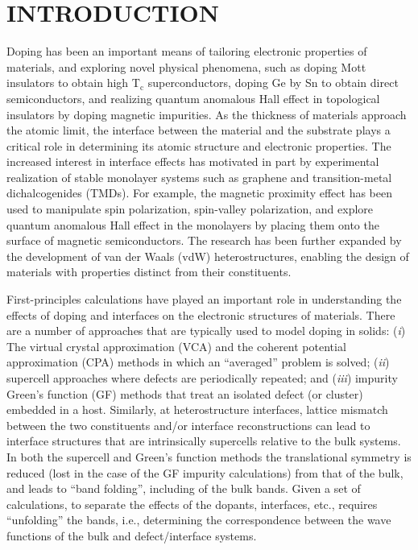 \documentclass[aps,prb,showpacs,twocolumn,reprint,superscriptaddress]{revtex4-1}
\begin{document}
\section{INTRODUCTION}
Doping has been an important means of tailoring electronic properties of materials, and exploring novel
physical phenomena, such as doping Mott insulators to obtain high T$_\mathrm{c}$
superconductors,\cite{bednorz_1986} doping Ge by Sn to obtain direct semiconductors, \cite{Gupta2013} and
realizing quantum anomalous Hall effect in topological insulators by doping magnetic
impurities.\cite{Yu2010,Chang2013} As the thickness of materials approach the atomic limit, the interface
between the material and the substrate plays a critical role in determining its atomic structure and electronic
properties.  The increased interest in interface effects has motivated in part by experimental realization of
stable monolayer systems such as graphene and transition-metal dichalcogenides (TMDs).  For example, the
magnetic proximity effect has been used to manipulate spin polarization, spin-valley polarization, and explore
quantum anomalous Hall effect in the monolayers by placing them onto the surface of magnetic
semiconductors.\cite{Yang2013,Wei2016,Li2015Giant,Zhang2016Large,Qiao2014,Wang2015,Zhang2015Quantum} The
research has been further expanded by the development of van der Waals (vdW) heterostructures, enabling
the design of materials with properties distinct from their constituents.\cite{Novoselov20162D} 

First-principles calculations have played an important role in understanding the effects of doping and
interfaces on the electronic structures of materials.  There are a number of approaches that are
typically used to model doping in solids: (\textit{i}) The virtual crystal approximation
(VCA)\cite{nordheim} and the coherent potential approximation (CPA)\cite{Gyorffy1972Coherent} methods in
which an ``averaged'' problem is solved; (\textit{ii}) supercell approaches where defects are
periodically repeated; and (\textit{iii}) impurity Green's function (GF) methods
\cite{KKR-defects,KKR-full} that treat an isolated defect (or cluster) embedded in a host. 
Similarly, at heterostructure interfaces, lattice mismatch
between the two constituents and/or interface reconstructions can lead to interface structures that are
intrinsically supercells relative to the bulk systems.  
In both the
supercell and Green's function methods the translational symmetry is reduced (lost in the case of the
GF impurity calculations) from that of the bulk, and leads to ``band folding'', including of the bulk
bands. Given a set of calculations, to separate the effects of the dopants, interfaces, etc., requires
``unfolding'' the bands, i.e., determining the correspondence between the wave functions of the bulk and
defect/interface systems.
\end{document}
